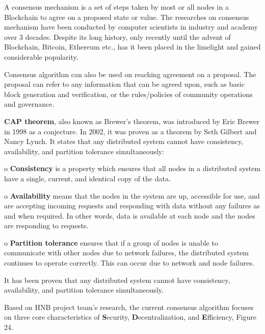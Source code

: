\documentclass[fleqn,10pt]{SelfArx} %
\begin{document}
A consensus mechanism is a set of steps taken by most or all nodes in a Blockchain to agree on a proposed state or value. The researches on consensus mechanism have been conducted by computer scientists in industry and academy over 3 decades. Despite its long history, only recently until the advent of Blockchain, Bitcoin, Ethereum etc., has it been placed in the limelight and gained considerable popularity. 

Consensus algorithm can also be used on reaching agreement on a proposal. The proposal can refer to any information that can be agreed upon, such as basic block generation and verification, or the rules/policies of community operations and governance.

\textbf{CAP theorem}, also known as Brewer's theorem, was introduced by Eric Brewer in 1998 as a conjecture. In 2002, it was proven as a theorem by Seth Gilbert and Nancy Lynch. It states that any distributed system cannot have consistency, availability, and partition tolerance simultaneously:

o	\textbf{Consistency} is a property which ensures that all nodes in a distributed system have a single, current, and identical copy of the data.

o	\textbf{Availability} means that the nodes in the system are up, accessible for use, and are accepting incoming requests and responding with data without any failures as and when required. In other words, data is available at each node and the nodes are responding to requests.

o	\textbf{Partition tolerance} ensures that if a group of nodes is unable to communicate with other nodes due to network failures, the distributed system continues to operate correctly. This can occur due to network and node failures.

It has been proven that any distributed system cannot have consistency, availability, and partition tolerance simultaneously.

Based on HNB project team’s research, the current consensus algorithm focuses on three core characteristics of \textbf{S}ecurity, \textbf{D}ecentralization, and \textbf{E}fficiency, Figure 24.
\end{document}
